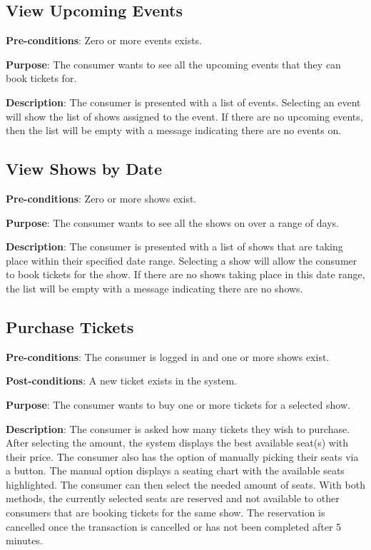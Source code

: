 \subsection{View Upcoming Events}
\textbf{Pre-conditions}: Zero or more events exists.

\textbf{Purpose}: The consumer wants to see all the upcoming events that they can book tickets for.

\textbf{Description}: The consumer is presented with a list of events. Selecting an event will show the list of shows assigned to the event. If there are no upcoming events, then the list will be empty with a message indicating there are no events on.

\subsection{View Shows by Date}
\textbf{Pre-conditions}: Zero or more shows exist.

\textbf{Purpose}: The consumer wants to see all the shows on over a range of days.

\textbf{Description}: The consumer is presented with a list of shows that are taking place within their specified date range. Selecting a show will allow the consumer to book tickets for the show. If there are no shows taking place in this date range, the list will be empty with a message indicating there are no shows.

\subsection{Purchase Tickets}
\textbf{Pre-conditions}: The consumer is logged in and one or more shows exist.

\textbf{Post-conditions}: A new ticket exists in the system.

\textbf{Purpose}: The consumer wants to buy one or more tickets for a selected show.

\textbf{Description}: The consumer is asked how many tickets they wish to purchase. After selecting the amount, the system displays the best available seat(s) with their price. The consumer also has the option of manually picking their seats via a button. The manual option displays a seating chart with the available seats highlighted. The consumer can then select the needed amount of seats. With both methods, the currently selected seats are reserved and not available to other consumers that are booking tickets for the same show. The reservation is cancelled once the transaction is cancelled or has not been completed after 5 minutes.

